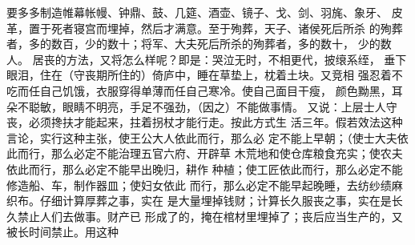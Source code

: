 \documentclass[12pt,UTF8]{ctexbook}
\begin{document}
要多多制造帷幕帐幔、钟鼎、鼓、几筵、酒壶、镜子、戈、剑、羽旄、象牙、 
皮革，置于死者寝宫而埋掉，然后才满意。至于殉葬，天子、诸侯死后所杀 
的殉葬者，多的数百，少的数十；将军、大夫死后所杀的殉葬者，多的数十， 
少的数人。 
居丧的方法，又将怎么样呢？即是：哭泣无时，不相更代，披缞系绖， 
垂下眼泪，住在（守丧期所住的）倚庐中，睡在草垫上，枕着土块。又竞相 
强忍着不吃而任自己饥饿，衣服穿得单薄而任自己寒冷。使自己面目干瘦， 
颜色黝黑，耳朵不聪敏，眼睛不明亮，手足不强劲，（因之）不能做事情。 
又说：上层士人守丧，必须搀扶才能起来，拄着拐杖才能行走。按此方式生 
活三年。假若效法这种言论，实行这种主张，使王公大人依此而行，那么必 
定不能上早朝；（使士大夫依此而行，那么必定不能治理五官六府、开辟草 
木荒地和使仓库粮食充实；使农夫依此而行，那么必定不能早出晚归，耕作 
种植；使工匠依此而行，那么必定不能修造船、车，制作器皿；使妇女依此 
而行，那么必定不能早起晚睡，去纺纱绩麻织布。仔细计算厚葬之事，实在 
是大量埋掉钱财；计算长久服丧之事，实在是长久禁止人们去做事。财产已 
形成了的，掩在棺材里埋掉了；丧后应当生产的，又被长时间禁止。用这种 
\end{document}
